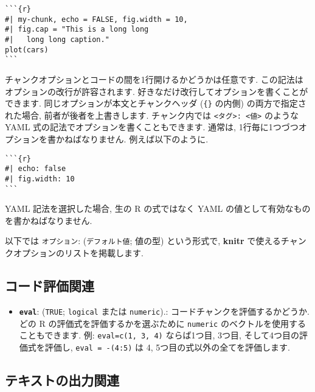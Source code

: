 \documentclass[
  lualatex,ja=standard,jafont=noto-otf]{bxjsreport}
\providecommand{\tightlist}{%
  \setlength{\itemsep}{0pt}\setlength{\parskip}{0pt}}
\begin{document}
\begin{verbatim}
```{r}
#| my-chunk, echo = FALSE, fig.width = 10,
#| fig.cap = "This is a long long
#|   long long caption."
plot(cars)
```
\end{verbatim}

チャンクオプションとコードの間を1行開けるかどうかは任意です.
この記法はオプションの改行が許容されます.
好きなだけ改行してオプションを書くことができます.
同じオプションが本文とチャンクヘッダ
(\texttt{\textasciigrave{}\textasciigrave{}\textasciigrave{}\{\}}
の内側) の両方で指定された場合, 前者が後者を上書きします. チャンク内では
\texttt{\textless{}タグ\textgreater{}:\ \textless{}値\textgreater{}}
のような YAML 式の記法でオプションを書くこともできます. 通常は,
1行毎に1つづつオプションを書かねばなりません. 例えば以下のように.

\begin{verbatim}
```{r}
#| echo: false
#| fig.width: 10
```
\end{verbatim}

YAML 記法を選択した場合, 生の R の式ではなく YAML
の値として有効なものを書かねばなりません.

以下では \texttt{オプション}: (\texttt{デフォルト値}; 値の型)
という形式で, \textbf{knitr}
で使えるチャンクオプションのリストを掲載します.

\hypertarget{evaluate}{%
\subsection{コード評価関連}\label{evaluate}}

\begin{itemize}
\tightlist
\item
  \textbf{\texttt{eval}}: (\texttt{TRUE}; \texttt{logical} または
  \texttt{numeric}).: コードチャンクを評価するかどうか. どの R
  の評価式を評価するかを選ぶために \texttt{numeric}
  のベクトルを使用することもできます. 例: \texttt{eval=c(1,\ 3,\ 4)}
  ならば1つ目, 3つ目, そして4つ目の評価式を評価し,
  \texttt{eval\ =\ -(4:5)} は 4, 5つ目の式以外の全てを評価します.
\end{itemize}

\hypertarget{text-output}{%
\subsection{テキストの出力関連}\label{text-output}}
\end{document}
